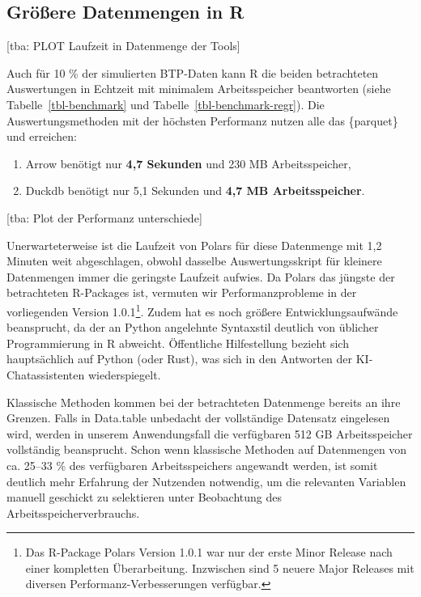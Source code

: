 \documentclass[
  german,
  10pt,
  twoside]{article}
\providecommand{\tightlist}{%
  \setlength{\itemsep}{0pt}\setlength{\parskip}{0pt}}
\let\oldtextbf\textbf
\renewcommand{\textbf}[1]{{\color{wistaBlue}\oldtextbf{#1}}}
\let\oldref\ref
\renewcommand{\ref}[1]{\oldref{#1}\raisebox{-0.2ex}{\scriptsize\color{wistaBlue}\ding{247}}}
\begin{document}
\clearpage

\subsection{Größere Datenmengen in
R}\label{gruxf6uxdfere-datenmengen-in-r}

{[}tba: PLOT Laufzeit in Datenmenge der Tools{]}

Auch für 10 \% der simulierten BTP-Daten kann R die beiden betrachteten
Auswertungen in Echtzeit mit minimalem Arbeitsspeicher beantworten
(siehe Tabelle~\ref{tbl-benchmark} und
Tabelle~\ref{tbl-benchmark-regr}). Die Auswertungsmethoden mit der
höchsten Performanz nutzen alle das \{parquet\} und erreichen:

\begin{enumerate}
\def\labelenumi{\arabic{enumi}.}
\tightlist
\item
  Arrow benötigt nur \textbf{4,7 Sekunden} und 230 MB Arbeitsspeicher,
\item
  Duckdb benötigt nur 5,1 Sekunden und \textbf{4,7 MB Arbeitsspeicher}.
\end{enumerate}

{[}tba: Plot der Performanz unterschiede{]}

Unerwarteterweise ist die Laufzeit von Polars für diese Datenmenge mit
1,2 Minuten weit abgeschlagen, obwohl dasselbe Auswertungsskript für
kleinere Datenmengen immer die geringste Laufzeit aufwies. Da Polars das
jüngste der betrachteten R-Packages ist, vermuten wir Performanzprobleme
in der vorliegenden Version 1.0.1\footnote{Das R-Package Polars Version
  1.0.1 war nur der erste Minor Release nach einer kompletten
  Überarbeitung. Inzwischen sind 5 neuere Major Releases mit diversen
  Performanz-Verbesserungen verfügbar.}. Zudem hat es noch größere
Entwicklungsaufwände beansprucht, da der an Python angelehnte Syntaxstil
deutlich von üblicher Programmierung in R abweicht. Öffentliche
Hilfestellung bezieht sich hauptsächlich auf Python (oder Rust), was
sich in den Antworten der KI-Chatassistenten wiederspiegelt.

Klassische Methoden kommen bei der betrachteten Datenmenge bereits an
ihre Grenzen. Falls in Data.table unbedacht der vollständige Datensatz
eingelesen wird, werden in unserem Anwendungsfall die verfügbaren 512 GB
Arbeitsspeicher vollständig beansprucht. Schon wenn klassische Methoden
auf Datenmengen von ca. 25--33 \% des verfügbaren Arbeitsspeichers
angewandt werden, ist somit deutlich mehr Erfahrung der Nutzenden
notwendig, um die relevanten Variablen manuell geschickt zu selektieren
unter Beobachtung des Arbeitsspeicherverbrauchs.
\end{document}
